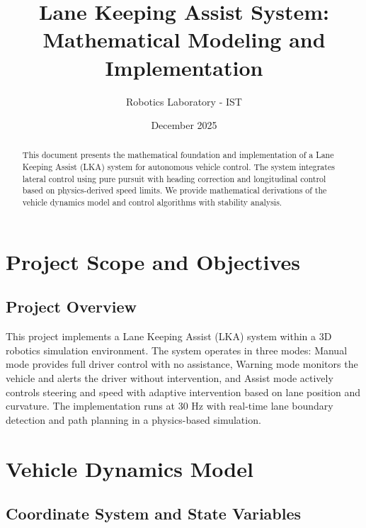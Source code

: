 \documentclass[11pt,a4paper]{article}
\title{\textbf{Lane Keeping Assist System:\\Mathematical Modeling and Implementation}}
\author{Robotics Laboratory - IST}
\date{December 2025}
\begin{document}
\maketitle

\begin{abstract}
This document presents the mathematical foundation and implementation of a Lane Keeping Assist (LKA) system for autonomous vehicle control. The system integrates lateral control using pure pursuit with heading correction and longitudinal control based on physics-derived speed limits. We provide mathematical derivations of the vehicle dynamics model and control algorithms with stability analysis.
\end{abstract}

\tableofcontents
\newpage

\section{Project Scope and Objectives}

\subsection{Project Overview}
This project implements a Lane Keeping Assist (LKA) system within a 3D robotics simulation environment. The system operates in three modes: Manual mode provides full driver control with no assistance, Warning mode monitors the vehicle and alerts the driver without intervention, and Assist mode actively controls steering and speed with adaptive intervention based on lane position and curvature. The implementation runs at 30 Hz with real-time lane boundary detection and path planning in a physics-based simulation.

\section{Vehicle Dynamics Model}

\subsection{Coordinate System and State Variables}
\end{document}
